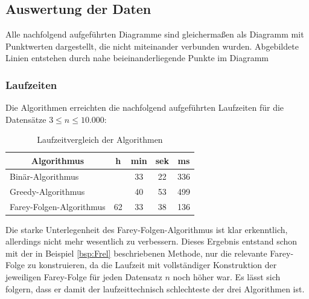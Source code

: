 \subsection{Auswertung der Daten}
Alle nachfolgend aufgeführten Diagramme sind gleichermaßen als Diagramm mit Punktwerten dargestellt, die nicht miteinander verbunden wurden. Abgebildete Linien entstehen durch nahe beieinanderliegende Punkte im Diagramm


\subsubsection{Laufzeiten}
Die Algorithmen erreichten die nachfolgend aufgeführten Laufzeiten für die Datensätze $3 \leq n \leq 10.000$:\\
\begin{table}[H]
	\centering
	\begin{tabular}{|l | c c c c|}
		\hline
		\multicolumn{1}{|c|}{\textbf{Algorithmus}} & h & min & sek & ms \\ \hline
		Binär-Algorithmus & & 33 & 22 & 336 \\ \hline
		Greedy-Algorithmus & & 40 &  53 & 499 \\ \hline
		Farey-Folgen-Algorithmus & 62 & 33 & 38 & 136 \\ \hline
	\end{tabular}
	\caption{Laufzeitvergleich der Algorithmen}
	\label{table:LaufzeitVgl}
\end{table}
Die starke Unterlegenheit des Farey-Folgen-Algorithmus ist klar erkenntlich, allerdings nicht mehr wesentlich zu verbessern. Dieses Ergebnis entstand schon mit der in Beispiel \ref{bsp:Frel} beschriebenen Methode, nur die relevante Farey-Folge zu konstruieren, da die Laufzeit mit vollständiger Konstruktion der jeweiligen Farey-Folge für jeden Datensatz $n$ noch höher war. Es lässt sich folgern, dass er damit der laufzeittechnisch schlechteste der drei Algorithmen ist.


